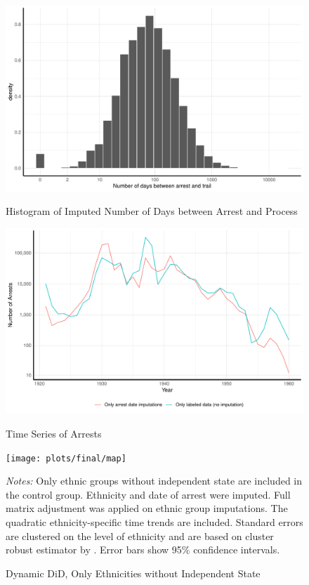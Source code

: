 \begin{figure}[H]
\centering
\caption{Histogram of Imputed Number of Days between Arrest and Process}
\includegraphics[width=1\textwidth]{plots/imputing_arrest_date/mixed_model_preds_hist.pdf}
\label{fig:mixed_model_preds_hist}
\end{figure}
\begin{figure}[H]
\caption{Time Series of Arrests }
\centering
\includegraphics[width=\textwidth]{plots/arrests/date_imputation_line.pdf}
\label{fig:date_imputation_line}
\end{figure}


 \begin{figure}[H]
\centering
\caption{Dynamic DiD, Only Ethnicities without Independent State}
\texttt{[image: plots/final/map]}
\begin{minipage}{0.92\textwidth}
\footnotesize
\emph{Notes:} Only ethnic groups without independent state are included in the control group. Ethnicity and date of arrest were imputed.  Full matrix adjustment was applied on ethnic group imputations. The quadratic ethnicity-specific time trends are included.  Standard errors are clustered on the level of ethnicity and are based on cluster robust estimator by \citet{pustejovsky_small-sample_2018}. Error bars show 95\% confidence intervals. 
\end{minipage}
\label{fig:did_effets_no_ind_countries}
\end{figure}

